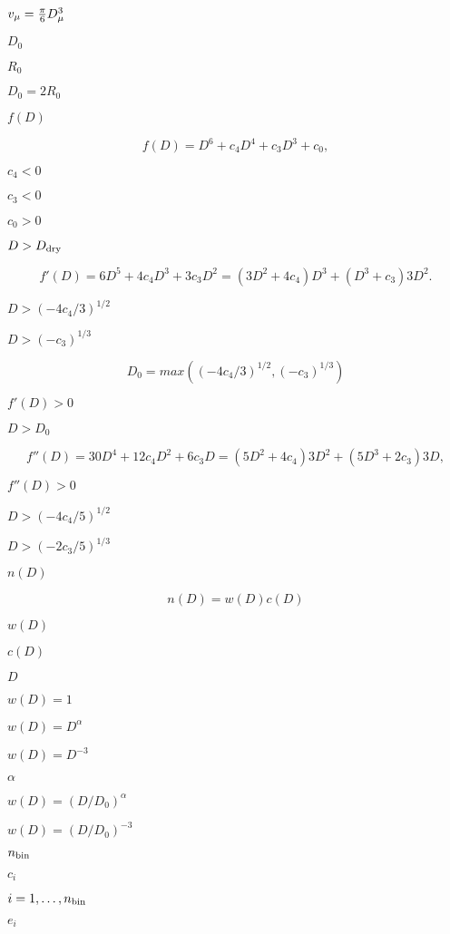 \documentclass{article}
\begin{document}
$v_{\rm \mu}
           = \frac{\pi}{6} D^3_{\rm \mu}$
\pagebreak

$D_0$
\pagebreak

$R_0$
\pagebreak

$D_0 = 2 R_0$
\pagebreak

$f(D)$
\pagebreak

\[
     f(D) = D^6 + c_4 D^4 + c_3 D^3 + c_0,
 \]
\pagebreak

$c_4 < 0$
\pagebreak

$c_3 < 0$
\pagebreak

$c_0 > 0$
\pagebreak

$D > D_{\rm dry}$
\pagebreak

\[
     f'(D) = 6 D^5 + 4 c_4 D^3 + 3 c_3 D^2
           = (3 D^2 + 4 c_4) D^3 + (D^3 + c_3) 3 D^2.
 \]
\pagebreak

$D > (-4 c_4 / 3)^{1/2}$
\pagebreak

$D > (-c_3)^{1/3}$
\pagebreak

\[
     D_0 = max((-4 c_4 / 3)^{1/2}, (-c_3)^{1/3})
 \]
\pagebreak

$f'(D) > 0$
\pagebreak

$D > D_0$
\pagebreak

\[
     f''(D) = 30 D^4 + 12 c_4 D^2 + 6 c_3 D
            = (5 D^2 + 4 c_4) 3 D^2 + (5 D^3 + 2 c_3) 3 D,
 \]
\pagebreak

$f''(D) > 0$
\pagebreak

$D
 > (-4 c_4 / 5)^{1/2}$
\pagebreak

$D > (-2 c_3 / 5)^{1/3}$
\pagebreak

$n(D)$
\pagebreak

\[ n(D) = w(D) c(D) \]
\pagebreak

$w(D)$
\pagebreak

$c(D)$
\pagebreak

$D$
\pagebreak

$w(D) = 1$
\pagebreak

$w(D) = D^\alpha$
\pagebreak

$w(D) =
     D^{-3}$
\pagebreak

$\alpha$
\pagebreak

$w(D) =
     (D/D_0)^\alpha$
\pagebreak

$w(D) =
     (D/D_0)^{-3}$
\pagebreak

$n_{\rm bin}$
\pagebreak

$c_i$
\pagebreak

$i =
 1,\ldots,n_{\rm bin}$
\pagebreak

$e_i$
\pagebreak
\end{document}
